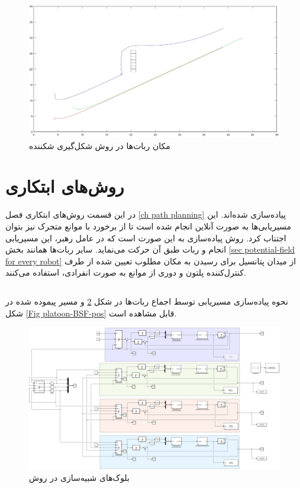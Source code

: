 \begin{figure}[!h]
	\centering
	\includegraphics[scale=0.2]{Images/platoon-potential-field-independent-pos.jpg}
	\caption{مکان ربات‌ها در روش شکل‌گیری شکننده}\label{Fig platoon-potential-field-independent-pos}
\end{figure}



\section{روش‌های ابتکاری}
در این قسمت روش‌های ابتکاری فصل \ref{ch path planning} پیاده‌سازی شده‌اند. این مسیریابی‌ها به صورت آنلاین انجام شده است تا از برخورد با موانع متحرک نیز بتوان اجتناب کرد. روش پیاده‌سازی به این صورت است که در عامل رهبر، این مسیریابی انجام و ربات طبق آن حرکت می‌نماید. سایر ربات‌ها همانند بخش \ref{sec potential-field for every robot} از میدان پتانسیل برای رسیدن به مکان مطلوب تعیین شده از طرف کنترل‌کننده پلتون و دوری از موانع به صورت انفرادی، استفاده می‌کنند.

\subsection{}
نحوه پیاده‌سازی مسیریابی  توسط اجماع ربات‌ها در شکل \ref{Fig platoon-BSF-simulink} و مسیر پیموده شده در شکل \ref{Fig platoon-BSF-pos} قابل مشاهده است.
\begin{figure}[!h]
	\centering
	\includegraphics[scale=0.22]{Images/platoon-BFS-simulink.png}
	\caption{بلوک‌های شبیه‌سازی در روش }\label{Fig platoon-BSF-simulink}
\end{figure}

